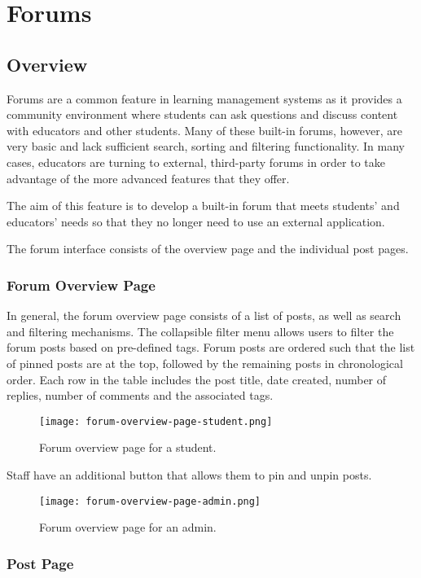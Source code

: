 \section{Forums}
\subsection{Overview}
Forums are a common feature in learning management systems as it provides a community environment where students can ask questions and discuss content with educators and other students.
Many of these built-in forums, however, are very basic and lack sufficient search, sorting and filtering functionality.
In many cases, educators are turning to external, third-party forums in order to take advantage of the more advanced features that they offer.

The aim of this feature is to develop a built-in forum that meets students' and educators' needs so that they no longer need to use an external application.

The forum interface consists of the overview page and the individual post pages.

\subsubsection{Forum Overview Page}

In general, the forum overview page consists of a list of posts, as well as search and filtering mechanisms.
The collapsible filter menu allows users to filter the forum posts based on pre-defined tags.
Forum posts are ordered such that the list of pinned posts are at the top, followed by the remaining posts in chronological order.
Each row in the table includes the post title, date created, number of replies, number of comments and the associated tags.

\begin{figure}[h!]
    \texttt{[image: forum-overview-page-student.png]}
    \centering
    \caption{Forum overview page for a student.}
\end{figure}

Staff have an additional button that allows them to pin and unpin posts.

\begin{figure}[h!]
    \texttt{[image: forum-overview-page-admin.png]}
    \centering
    \caption{Forum overview page for an admin.}
\end{figure}

\subsubsection{Post Page}

